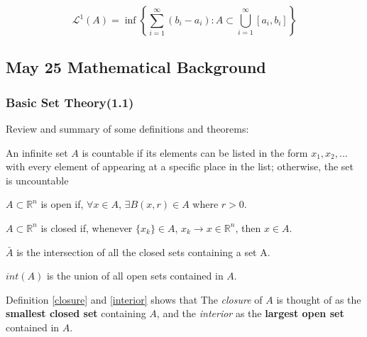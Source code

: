 \begin{definition} 
    $$\mathcal{L}^{1}(A)=\inf \left\{\sum_{i=1}^{\infty}\left(b_{i}-a_{i}\right): A \subset \bigcup_{i=1}^{\infty}\left[a_{i}, b_{i}\right]\right\}$$
\end{definition}


\newpage

\subsection{May 25 Mathematical Background}
\subsubsection{Basic Set Theory(1.1)}

Review and summary of some definitions and theorems:

\begin{definition}[Countable]
    An infinite set $A$ is countable if its elements 
    can be listed in the form $x_1, x_2, ...$ with every 
    element of appearing at a specific place in the list; 
    otherwise, the set is uncountable
\end{definition}

\begin{definition}[Open]
    $A \subset \mathbb{R}^n$ is open if, $\forall x\in A$, $\exists B(x, r)\in A$ where $r>0$.
\end{definition}

\begin{definition}[Closed]
    $A \subset \mathbb{R}^n$ is closed if, whenever $\{x_k\}\in A$, $x_k\rightarrow x \in \mathbb{R}^n$, then $x\in A$.
\end{definition}

\begin{definition}[Closure]\label{closure}
    $\bar{A}$ is the intersection of all the closed sets containing a set A. 
\end{definition}

\begin{definition}[Interior]\label{interior}
    $int(A)$ is the union of all open sets contained in $A$.
\end{definition}

Definition \ref{closure} and \ref{interior} shows that The \textit{closure} 
of $A$ is thought of as the \textbf{smallest closed set} containing $A$, 
and the \textit{interior} as the \textbf{largest open set} contained in $A$.

